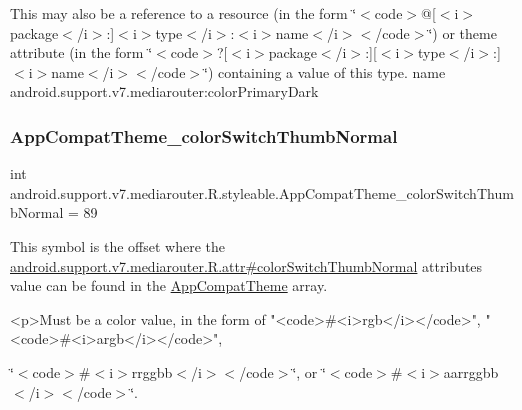 This may also be a reference to a resource (in the form \char`\"{}$<$code$>$@\mbox{[}$<$i$>$package$<$/i$>$\+:\mbox{]}$<$i$>$type$<$/i$>$\+:$<$i$>$name$<$/i$>$$<$/code$>$\char`\"{}) or theme attribute (in the form \char`\"{}$<$code$>$?\mbox{[}$<$i$>$package$<$/i$>$\+:\mbox{]}\mbox{[}$<$i$>$type$<$/i$>$\+:\mbox{]}$<$i$>$name$<$/i$>$$<$/code$>$\char`\"{}) containing a value of this type.  name android.\+support.\+v7.\+mediarouter\+:color\+Primary\+Dark \mbox{\label{classandroid_1_1support_1_1v7_1_1mediarouter_1_1R_1_1styleable_aa3284b705f7b27b8788c23ea647f66df}} 
\subsubsection{\texorpdfstring{App\+Compat\+Theme\+\_\+color\+Switch\+Thumb\+Normal}{AppCompatTheme\_colorSwitchThumbNormal}}
{\footnotesize\ttfamily int android.\+support.\+v7.\+mediarouter.\+R.\+styleable.\+App\+Compat\+Theme\+\_\+color\+Switch\+Thumb\+Normal = 89\hspace{0.3cm}{\ttfamily [static]}}

This symbol is the offset where the \hyperlink{classandroid_1_1support_1_1v7_1_1mediarouter_1_1R_1_1attr_a4ba590583f4d6afa70e3b4d78c92e2bc}{android.\+support.\+v7.\+mediarouter.\+R.\+attr\#color\+Switch\+Thumb\+Normal} attribute\textquotesingle{}s value can be found in the \hyperlink{classandroid_1_1support_1_1v7_1_1mediarouter_1_1R_1_1styleable_a4e3d3900c75d49aeb2f283cac00214d6}{App\+Compat\+Theme} array.

\begin{DoxyVerb}      <p>Must be a color value, in the form of "<code>#<i>rgb</i></code>", "<code>#<i>argb</i></code>",
\end{DoxyVerb}
 \char`\"{}$<$code$>$\#$<$i$>$rrggbb$<$/i$>$$<$/code$>$\char`\"{}, or \char`\"{}$<$code$>$\#$<$i$>$aarrggbb$<$/i$>$$<$/code$>$\char`\"{}. 


